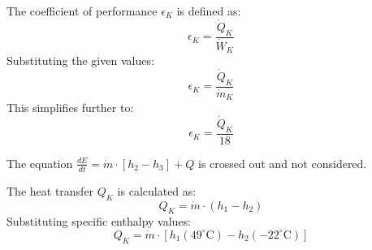 The coefficient of performance \( \epsilon_K \) is defined as:  
\[
\epsilon_K = \frac{\dot{Q}_K}{\dot{W}_K}
\]  
Substituting the given values:  
\[
\epsilon_K = \frac{\dot{Q}_K}{\dot{m}_K}
\]  
This simplifies further to:  
\[
\epsilon_K = \frac{\dot{Q}_K}{18}
\]  

The equation \( \frac{dE}{dt} = \dot{m} \cdot [h_2 - h_3] + Q \) is crossed out and not considered.  

The heat transfer \( Q_K \) is calculated as:  
\[
Q_K = \dot{m} \cdot (h_1 - h_2)
\]  
Substituting specific enthalpy values:  
\[
Q_K = \dot{m} \cdot \left[ h_1(49^\circ\text{C}) - h_2(-22^\circ\text{C}) \right]
\]